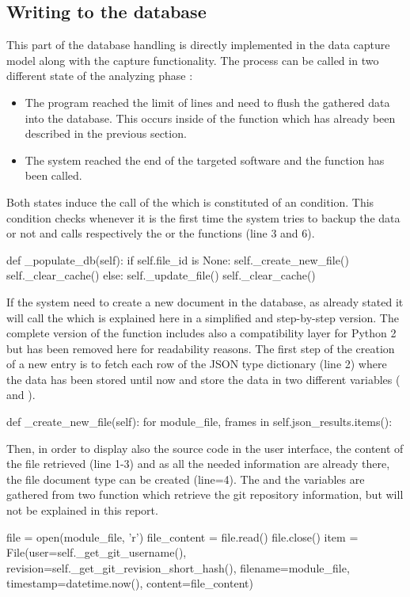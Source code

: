\subsection{Writing to the database}
This part of the database handling is directly implemented in the data capture model along with the capture functionality. The process can be called in two different state of the analyzing phase : 
\begin{itemize}
  \item The program reached the limit of lines and need to flush the gathered data into the database. This occurs inside of the  function which has already been described in the previous section. 
  \item The system reached the end of the targeted software and the function  has been called.
\end{itemize}
Both states induce the call of the  which is constituted of an  condition. This condition checks whenever it is the first time the system tries to backup the data or not and calls respectively the  or the  functions (line 3 and 6).
\begin{python}
def _populate_db(self):
    if self.file_id is None:
        self._create_new_file()
        self._clear_cache()
    else:
        self._update_file()
        self._clear_cache()
\end{python}

If the system need to create a new document in the database, as already stated it will call the  which is explained here in a simplified and step-by-step version. The complete version of the function includes also a compatibility layer for Python 2 but has been removed here for readability reasons. The first step of the creation of a new entry is to fetch each row of the JSON type dictionary (line 2) where the data has been stored until now and store the data in two different variables ( and ).
\begin{python}
def _create_new_file(self):
  for module_file, frames in self.json_results.items():
\end{python}
 
Then, in order to display also the source code in the user interface, the content of the file retrieved (line 1-3) and as all the needed information are already there, the file document type can be created (line=4). The  and the  variables are gathered from two function which retrieve the git repository information, but will not be explained in this report.
\begin{python}
file = open(module_file, 'r')
file_content = file.read()
file.close()
item = File(user=self._get_git_username(), revision=self._get_git_revision_short_hash(), filename=module_file, timestamp=datetime.now(), content=file_content)
\end{python}

